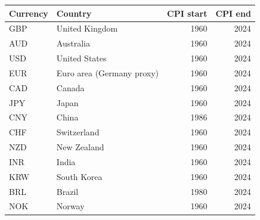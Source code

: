 \begin{tabular}{llrr}
\toprule
Currency & Country & CPI start & CPI end \\
\midrule
GBP & United Kingdom & 1960 & 2024 \\
AUD & Australia & 1960 & 2024 \\
USD & United States & 1960 & 2024 \\
EUR & Euro area (Germany proxy) & 1960 & 2024 \\
CAD & Canada & 1960 & 2024 \\
JPY & Japan & 1960 & 2024 \\
CNY & China & 1986 & 2024 \\
CHF & Switzerland & 1960 & 2024 \\
NZD & New Zealand & 1960 & 2024 \\
INR & India & 1960 & 2024 \\
KRW & South Korea & 1960 & 2024 \\
BRL & Brazil & 1980 & 2024 \\
NOK & Norway & 1960 & 2024 \\
\bottomrule
\end{tabular}
